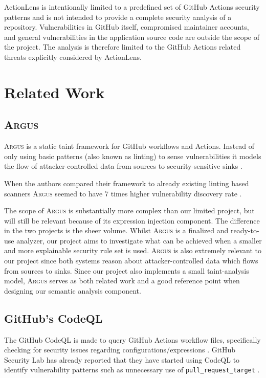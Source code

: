\documentclass{article}
\begin{document}
ActionLens is intentionally limited to a predefined set of GitHub Actions security patterns and is not intended to provide a complete security analysis of a repository. Vulnerabilities in GitHub itself, compromised maintainer accounts, and general vulnerabilities in the application source code are outside the scope of the project. The analysis is therefore limited to the GitHub Actions related threats explicitly considered by ActionLens.

\section{Related Work}

\subsection{\textsc{\textmd{Argus}}}

\textsc{Argus} is a static taint framework for GitHub workflows and Actions. Instead of only using basic patterns (also known as linting) to sense vulnerabilities it models the flow of attacker-controlled data from sources to security-sensitive sinks \cite{muralee2023}. 

When the authors compared their framework to already existing linting based scanners \textsc{Argus} seemed to have 7 times higher vulnerability discovery rate \cite{muralee2023}. 

The scope of \textsc{Argus} is substantially more complex than our limited project, but will still be relevant because of its expression injection component. The difference in the two projects is the sheer volume. Whilst \textsc{Argus} is a finalized and ready-to-use analyzer, our project aims to investigate what can be achieved when a smaller and more explainable security rule set is used. \textsc{Argus} is also extremely relevant to our project since both systems reason about attacker-controlled data which flows from sources to sinks. Since our project also implements a small taint-analysis model, \textsc{Argus} serves as both related work and a good reference point when designing our semantic analysis component.

\subsection{GitHub's CodeQL}

The GitHub CodeQL is made to query GitHub Actions workflow files, specifically checking for security issues regarding configurations/expressions \cite{githubcodeql}. GitHub Security Lab has already reported that they have started using CodeQL to identify vulnerability patterns such as unnecessary use of \texttt{pull\_request\_target} \cite{githubsecuritylabcodeql}. 
\end{document}
